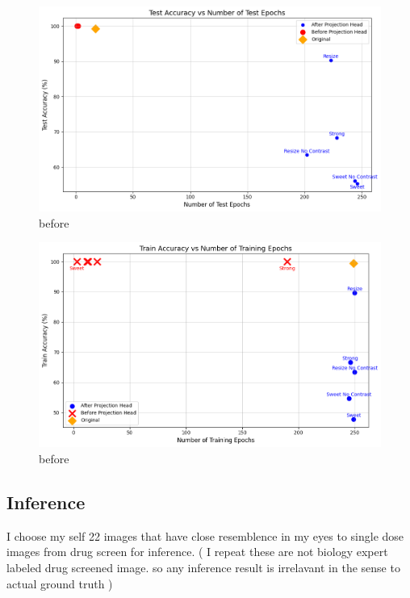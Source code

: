           \begin{figure}[H]
            \centering
            \includegraphics[scale=0.5]{figures/test_class.png} 
            \caption{before}
            \label{fig:before}
          \end{figure}

          \begin{figure}[H]
            \centering
            \includegraphics[scale=0.5]{figures/train_class.png} 
            \caption{before}
            \label{fig:before}
          \end{figure}
\subsection{Inference}

I choose my self 22 images that have close resemblence in my eyes to single dose images from drug screen for inference. ( I repeat these are not biology expert labeled drug 
screened image. so any inference result is irrelavant in the sense to actual ground truth )

